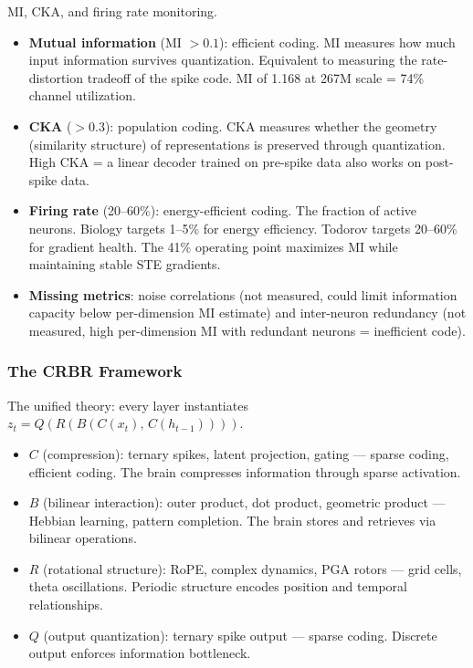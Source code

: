 \documentclass[11pt,a4paper]{article}
\begin{document}
MI, CKA, and firing rate monitoring.

\begin{itemize}
  \item \textbf{Mutual information} (MI $> 0.1$): efficient coding. MI measures how much input information survives quantization. Equivalent to measuring the rate-distortion tradeoff of the spike code. MI of 1.168 at 267M scale = 74\% channel utilization.
  \item \textbf{CKA} ($> 0.3$): population coding. CKA measures whether the geometry (similarity structure) of representations is preserved through quantization. High CKA = a linear decoder trained on pre-spike data also works on post-spike data.
  \item \textbf{Firing rate} (20--60\%): energy-efficient coding. The fraction of active neurons. Biology targets 1--5\% for energy efficiency. Todorov targets 20--60\% for gradient health. The 41\% operating point maximizes MI while maintaining stable STE gradients.
  \item \textbf{Missing metrics}: noise correlations (not measured, could limit information capacity below per-dimension MI estimate) and inter-neuron redundancy (not measured, high per-dimension MI with redundant neurons = inefficient code).
\end{itemize}

\subsubsection{The CRBR Framework}

The unified theory: every layer instantiates $z_t = Q(R(B(C(x_t),\, C(h_{t-1}))))$.

\begin{itemize}
  \item $C$ (compression): ternary spikes, latent projection, gating --- sparse coding, efficient coding. The brain compresses information through sparse activation.
  \item $B$ (bilinear interaction): outer product, dot product, geometric product --- Hebbian learning, pattern completion. The brain stores and retrieves via bilinear operations.
  \item $R$ (rotational structure): RoPE, complex dynamics, PGA rotors --- grid cells, theta oscillations. Periodic structure encodes position and temporal relationships.
  \item $Q$ (output quantization): ternary spike output --- sparse coding. Discrete output enforces information bottleneck.
\end{itemize}
\end{document}
